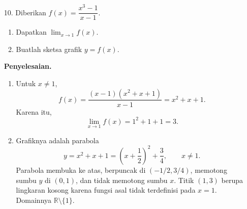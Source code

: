 \documentclass[11pt,a4paper]{article}
\newcommand{\jawab}{\par\medskip\textbf{Penyelesaian.}\par}
\newcommand{\R}{\mathbb{R}}
\begin{document}
\begin{enumerate}
\jawab
Untuk $x\neq2$, faktorisasi selisih kubus memberikan
\[
    f(x)=\frac{(x-2)(x^2+2x+4)}{x-2}=x^2+2x+4.
\]
Dengan demikian,
\[
    \lim_{x\to2}f(x)=2^2+2(2)+4=12.
\]
Agar limit sama dengan $f(2)=k$, harus dipilih $\boxed{k=12}$.
Karena polinomial $x^2+2x+4$ juga bernilai $12$ pada $x=2$, diperoleh
\[
    \boxed{f(x)=x^2+2x+4\quad\text{untuk semua }x\in\R.}
\]

\item[10.] Diberikan $f(x)=\dfrac{x^3-1}{x-1}$.
\begin{enumerate}
    \item Dapatkan $\displaystyle\lim_{x\to1}f(x)$.
    \item Buatlah sketsa grafik $y=f(x)$.
\end{enumerate}

\jawab
\begin{enumerate}
    \item Untuk $x\neq1$,
    \[
        f(x)=\frac{(x-1)(x^2+x+1)}{x-1}=x^2+x+1.
    \]
    Karena itu,
    \[
        \boxed{\lim_{x\to1}f(x)=1^2+1+1=3.}
    \]

    \item Grafiknya adalah parabola
    \[
        y=x^2+x+1=\left(x+\frac12\right)^2+\frac34,
        \qquad x\neq1.
    \]
    Parabola membuka ke atas, berpuncak di $(-1/2,3/4)$, memotong
    sumbu $y$ di $(0,1)$, dan tidak memotong sumbu $x$. Titik $(1,3)$
    berupa lingkaran kosong karena fungsi asal tidak terdefinisi pada
    $x=1$. Domainnya $\R\setminus\{1\}$.
    \begin{center}
    \end{center}
\end{enumerate}


\end{enumerate}
\end{document}
